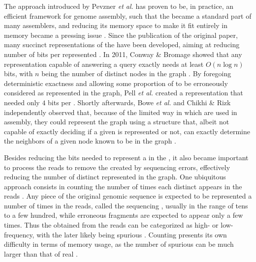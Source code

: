 The approach introduced by Pevzner \emph{et al.} has proven to be, in practice, an efficient framework for genome assembly, such that the \dBG became a standard part of many assemblers, and reducing its memory space to make it fit entirely in memory became a pressing issue \cite{Chikhi2014}. Since the publication of the original paper, many succinct representations of the \dBG have been developed, aiming at reducing number of bits per represented \kmer. In 2011, Conway \& Bromage showed that any \dBG representation capable of answering a \kmer query exactly needs at least $O(n \log n)$ bits, with $n$ being the number of distinct nodes in the graph \cite{Conway2011}. By foregoing deterministic exactness and allowing some proportion of  to be erroneously considered as represented in the graph, Pell \emph{et al.} created a representation that needed only $4$ bits per \kmer \cite{Pell2012}. Shortly afterwards, Bowe \emph{et al.} and Chikhi \& Rizk independently observed that, because of the limited way in which  are used in assembly, they could represent the graph using a structure that, albeit not capable of exactly deciding if a given \kmer is represented or not, can exactly determine the neighbors of a given node known to be in the graph \cite{Bowe2012, Chikhi2013}.

Besides reducing the bits needed to represent a \kmer in the \dBG, it also became important to process the reads to remove the  created by sequencing errors, effectively reducing the number of distinct  represented in the graph. One ubiquitous approach consists in counting the number of times each distinct \kmer appears in the reads \cite{Zhang2014}. Any piece of the original genomic sequence is expected to be represented a  number of times in the reads, called the sequencing , usually in the range of tens to a few hundred, while erroneous fragments are expected to appear only a few times. Thus the  obtained from the reads can be categorized as high- or low-frequency, with the later likely being spurious \cite{Conway2011, Ghosh2019}. Counting \kmers presents its own difficulty in terms of memory usage, as the number of spurious  can be much larger than that of real  \cite{Conway2011, Melsted2011, Zhang2014, Ghosh2019}.

